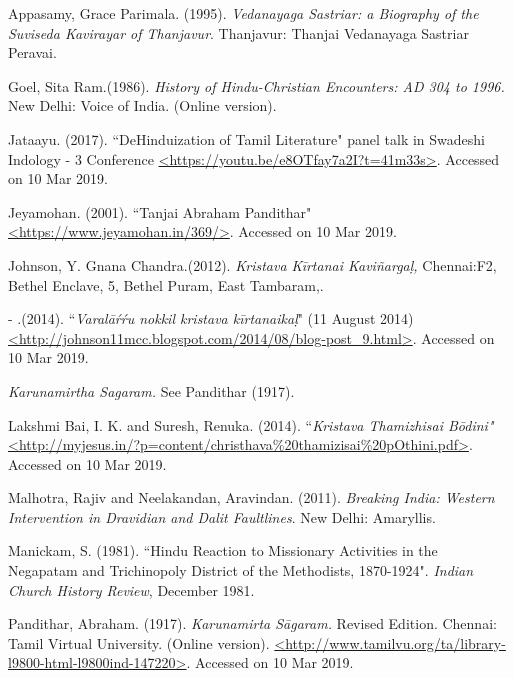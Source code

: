 \begin{thebibliography}{99}
\itemsep=0pt

  Appasamy, Grace Parimala. (1995). \textit{Vedanayaga Sastriar: a Biography of the Suviseda Kavirayar of Thanjavur}. Thanjavur: Thanjai Vedanayaga Sastriar Peravai.

  Goel, Sita Ram.(1986).\textit{ History of Hindu-Christian Encounters: AD 304 to 1996. }New Delhi: Voice of India. (Online version).

  Jataayu. (2017). ``DeHinduization of Tamil Literature" panel talk in Swadeshi Indology - 3 Conference \url{<https://youtu.be/e8OTfay7a2I?t=41m33s>}. Accessed on 10 Mar 2019.

  Jeyamohan. (2001). ``Tanjai Abraham Pandithar" \url{<https://www.jeyamohan.in/369/>}. Accessed on 10 Mar 2019.

  Johnson, Y. Gnana Chandra.(2012).\textit{ Kristava Kīrtanai Kaviñargaḷ, }Chennai:F2, Bethel Enclave, 5, Bethel Puram, East Tambaram,.

  - .(2014). ``\textit{Varalāŕŕu nokkil kristava kīrtanaikaḷ}" (11 August 2014) \url{<http://johnson11mcc.blogspot.com/2014/08/blog-post_9.html>}. Accessed on 10 Mar 2019.

  \textit{Karunamirtha Sagaram. }See Pandithar (1917).

  Lakshmi Bai, I. K. and Suresh, Renuka. (2014). ``\textit{Kristava Thamizhisai Bōdini"} \url{<http://myjesus.in/?p=content/christhava%20thamizisai%20pOthini.pdf>}. Accessed on 10 Mar 2019.

  Malhotra, Rajiv and Neelakandan, Aravindan. (2011). \textit{Breaking India: Western Intervention in Dravidian and Dalit Faultlines}. New Delhi: Amaryllis.

  Manickam, S. (1981). ``Hindu Reaction to Missionary Activities in the Negapatam and Trichinopoly District of the Methodists, 1870-1924". \textit{Indian Church History Review}, December 1981.

  Pandithar, Abraham. (1917). \textit{Karunamirta Sāgaram. }Revised Edition. Chennai: Tamil Virtual University. (Online version). \url{<http://www.tamilvu.org/ta/library-l9800-html-l9800ind-147220>}. Accessed on 10 Mar 2019.


\end{thebibliography}
